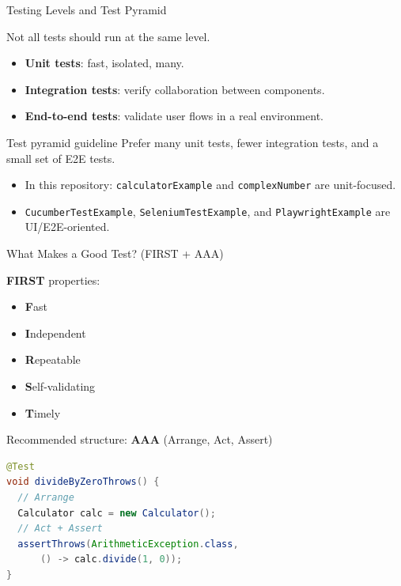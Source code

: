 \documentclass[11pt, xcolor=svgnames]{beamer}
\providecommand{\alert}[1]{\textbf{#1}}
\begin{document}
\begin{frame}{Testing Levels and Test Pyramid}

Not all tests should run at the same level.

\begin{itemize}
  \item \alert{Unit tests}: fast, isolated, many.
  \item \alert{Integration tests}: verify collaboration between components.
  \item \alert{End-to-end tests}: validate user flows in a real environment.
\end{itemize}

\begin{block}{Test pyramid guideline}
  Prefer many unit tests, fewer integration tests, and a small set of E2E tests.
\end{block}

\begin{itemize}
  \item In this repository: \texttt{calculatorExample} and \texttt{complexNumber} are unit-focused.
  \item \texttt{CucumberTestExample}, \texttt{SeleniumTestExample}, and \texttt{PlaywrightExample} are UI/E2E-oriented.
\end{itemize}

\end{frame}


\begin{frame}[fragile]{What Makes a Good Test? (FIRST + AAA)}

\textbf{FIRST} properties:
\begin{itemize}
  \item \textbf{F}ast
  \item \textbf{I}ndependent
  \item \textbf{R}epeatable
  \item \textbf{S}elf-validating
  \item \textbf{T}imely
\end{itemize}

Recommended structure: \alert{AAA} (Arrange, Act, Assert)

\begin{lstlisting}[language=Java,basicstyle=\scriptsize]
@Test
void divideByZeroThrows() {
  // Arrange
  Calculator calc = new Calculator();
  // Act + Assert
  assertThrows(ArithmeticException.class,
      () -> calc.divide(1, 0));
}
\end{lstlisting}

\end{frame}
\end{document}
